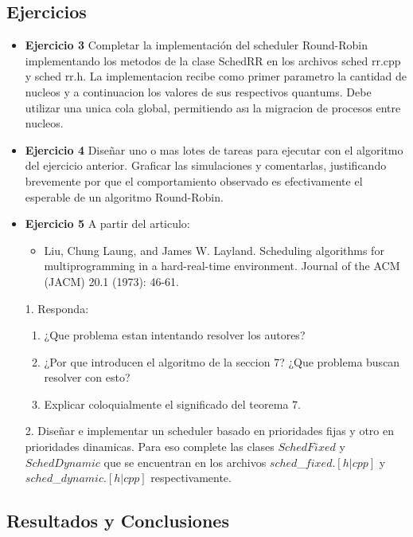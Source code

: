 
\subsection{Ejercicios}
\begin{itemize}
 \item 
\textbf{Ejercicio 3}  Completar la implementación del scheduler Round-Robin implementando los
metodos de la clase SchedRR en los archivos sched rr.cpp y sched rr.h. La implementacion
recibe como primer parametro la cantidad de nucleos y a continuacion los valores de sus
respectivos quantums. Debe utilizar una unica cola global, permitiendo ası la migracion de
procesos entre nucleos.
\item \textbf{Ejercicio 4} Diseñar uno o mas lotes de tareas para ejecutar con el algoritmo del ejercicio
anterior. Graficar las simulaciones y comentarlas, justificando brevemente por que el comportamiento 
observado es efectivamente el esperable de un algoritmo Round-Robin.
\item \textbf{Ejercicio 5} A partir del articulo:\\
\begin{itemize}
 \item Liu, Chung Laung, and James W. Layland. Scheduling algorithms for multiprogramming
in a hard-real-time environment. Journal of the ACM (JACM) 20.1 (1973): 46-61.
\end{itemize}
1. Responda:
\begin{enumerate}
 \item ¿Que problema estan intentando resolver los autores?
 \item ¿Por que introducen el algoritmo de la seccion 7? ¿Que problema buscan resolver
con esto?
\item Explicar coloquialmente el significado del teorema 7.
\end{enumerate}
2. Diseñar e implementar un scheduler basado en prioridades fijas y otro en prioridades
dinamicas. Para eso complete las clases $SchedFixed$ y $SchedDynamic$ que se encuentran
en los archivos $sched$\_$fixed.[h|cpp]$ y $sched$\_$dynamic.[h|cpp]$ respectivamente.
\end{itemize}


\subsection{Resultados y Conclusiones}

